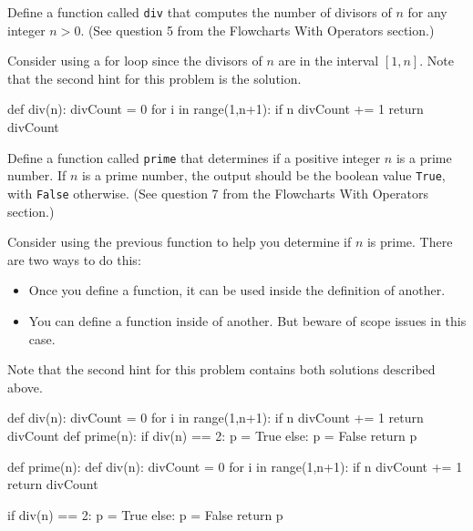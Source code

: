 \documentclass{ximera}
\begin{document}
\begin{question}
	Define a function called \verb|div| that computes the number of divisors of $n$ for any integer $n>0$. (See question 5 from the Flowcharts With Operators section.)
	\begin{hint}
	Consider using a for loop since the divisors of $n$ are in the interval $[1,n]$. Note that the second hint for this problem is the solution.
	\end{hint}
	\begin{hint}
\begin{sageCell}
def div(n):
        divCount = 0
        for i in range(1,n+1):
                if n%
                        divCount += 1
        return divCount
\end{sageCell}
	\end{hint}
\end{question}

\begin{question}
	Define a function called \verb|prime| that determines if a positive integer $n$ is a prime number. If $n$ is a prime number, the output should be the boolean value \verb|True|, with \verb|False| otherwise. (See question 7 from the Flowcharts With Operators section.)
	\begin{hint}
	Consider using the previous function to help you determine if $n$ is prime. There are two ways to do this:
	\begin{itemize}
	\item Once you define a function, it can be used inside the definition of another. 
	\item You can define a function inside of another. But beware of scope issues in this case.
	\end{itemize}
	Note that the second hint for this problem contains both solutions described above.
	\end{hint}
	\begin{hint}
\begin{sageCell}
def div(n):
        divCount = 0
        for i in range(1,n+1):
                if n%
                        divCount += 1
        return divCount
def prime(n):
        if div(n) == 2:
                p = True
        else:
                p = False
        return p
\end{sageCell}
\begin{sageCell}
def prime(n):
        def div(n):
                divCount = 0
                for i in range(1,n+1):
                        if n%
                                divCount += 1
                return divCount

	if div(n) == 2:
                p = True
        else:
                p = False
        return p
\end{sageCell}
	\end{hint}
\end{question}
\end{document}
